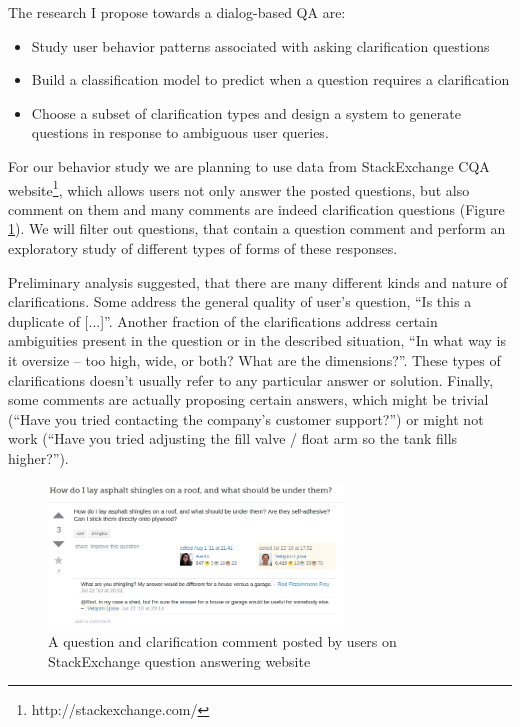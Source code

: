 The research I propose towards a dialog-based QA are:
\begin{itemize}
\item Study user behavior patterns associated with asking clarification questions
\item Build a classification model to predict when a question requires a clarification
\item Choose a subset of clarification types and design a system to generate questions in response to ambiguous user queries.
\end{itemize}

For our behavior study we are planning to use data from StackExchange CQA website\footnote{http://stackexchange.com/}, which allows users not only answer the posted questions, but also comment on them and many comments are indeed clarification questions (Figure \ref{figure:user:clarification:stackexchange}).
We will filter out questions, that contain a question comment and perform an exploratory study of different types of forms of these responses.

Preliminary analysis suggested, that there are many different kinds and nature of clarifications.
Some address the general quality of user's question, \eg ``Is this a duplicate of [...]''.
Another fraction of the clarifications address certain ambiguities present in the question or in the described situation, \eg ``In what way is it oversize -- too high, wide, or both? What are the dimensions?''.
These types of clarifications doesn't usually refer to any particular answer or solution.
Finally, some comments are actually proposing certain answers, which might be trivial (``Have you tried contacting the company's customer support?'') or might not work (``Have you tried adjusting the fill valve / float arm so the tank fills higher?'').

\begin{figure}[h]
\centering
\includegraphics[width=0.7\textwidth]{img/stackexchange_example}
\caption{A question and clarification comment posted by users on StackExchange question answering website}
\label{figure:user:clarification:stackexchange}
\end{figure}



